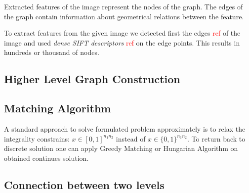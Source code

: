 \documentclass[
	fontsize=12pt,
	paper=a4,
	twoside=false,
	numbers=noenddot,
	plainheadsepline,
	toc=listof,
	toc=bibliography
]{scrartcl}
\newcommand\ToDo[1]{\textcolor{red}{#1}}
\begin{document}
Extracted features of the image represent the nodes of the graph. The edges of the graph contain information about geometrical relations between the feature.

To extract features from the given image we detected first the edges \ToDo{ref} of the image and used \emph{dense SIFT descriptors} \ToDo{ref} on the edge points. This results in hundreds or thousand of nodes.








\subsection{Higher Level Graph Construction}

\subsection{Matching Algorithm}

A standard approach to solve formulated problem approximately is to relax the integrality constrains: $x\in [0,1]^{n_1n_2}$ instead of  $x\in \{0,1\}^{n_1n_2}$. To return back to discrete solution one can apply Greedy Matching or Hungarian Algorithm \cite{Kuhn1955} on obtained continues solution.

\subsection{Connection between two levels}




	
\end{document}

